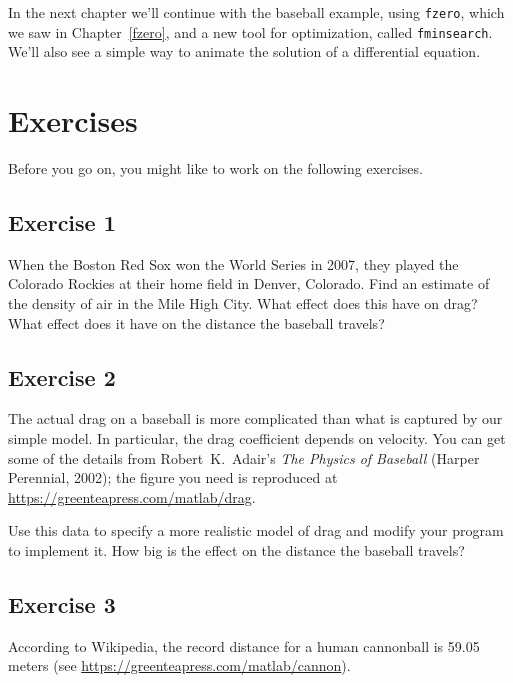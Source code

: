 In the next chapter we'll continue with the baseball example, using \lstinline{fzero}, which we saw in Chapter~\ref{fzero}, and a new tool for optimization, called \lstinline{fminsearch}.  We'll also see a simple way to animate the solution of a differential equation.


\section{Exercises}

Before you go on, you might like to work on the following exercises.

\subsection{Exercise 1}


When the Boston Red Sox won the World Series in 2007, they played the
Colorado Rockies at their home field in Denver, Colorado.  Find an
estimate of the density of air in the Mile High City.  What effect
does this have on drag?  What effect does it have on the distance the baseball travels?

\subsection{Exercise 2}


The actual drag on a baseball is more complicated than what is
captured by our simple model.  In particular, the drag coefficient
depends on velocity.  You can get some of the details from Robert~K.\ Adair's {\em The
Physics of Baseball} (Harper Perennial, 2002); the figure you need is reproduced at \url{https://greenteapress.com/matlab/drag}.

Use this data to specify a more realistic model of drag and modify your
program to implement it.  How big is the effect on the distance the baseball travels?


\subsection{Exercise 3}
\label{cannon}


According to Wikipedia, the record distance for a human cannonball is 59.05 meters (see \url{https://greenteapress.com/matlab/cannon}).

